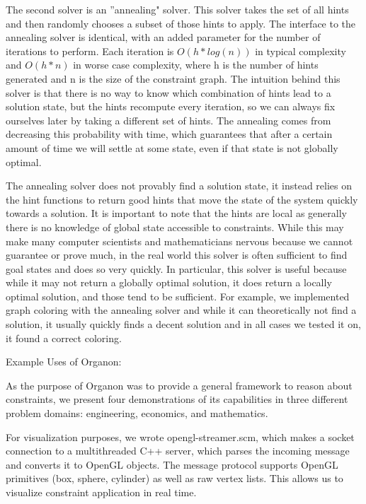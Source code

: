 \documentclass[12pt,a4paper]{article}
\begin{document}
The second solver is an ''annealing" solver. This solver takes the set of all hints and then randomly chooses a subset of those hints to apply. The interface to the annealing solver is identical, with an added parameter for the number of iterations to perform. Each iteration is $O(h * log(n))$ in typical complexity and $O(h*n)$ in worse case complexity, where h is the number of hints generated and n is the size of the constraint graph.   The intuition behind this solver is that there is no way to know which combination of hints lead to a solution state, but the hints recompute every iteration, so we can always fix ourselves later by taking a different set of hints.  The annealing comes from decreasing this probability with time, which guarantees that after a certain amount of time we will settle at some state, even if that state is not globally optimal.  

The annealing solver does not provably find a solution state, it instead relies on the hint functions to return good hints that move the state of the system quickly towards a solution.  It is important to note that the hints are local as generally there is no knowledge of global state accessible to constraints.  While this may make many computer scientists and mathematicians nervous because we cannot guarantee or prove much, in the real world this solver is often sufficient to find goal states and does so very quickly.  In particular, this solver is useful because while it may not return a globally optimal solution, it does return a locally optimal solution, and those tend to be sufficient.  For example, we implemented graph coloring with the annealing solver and while it can theoretically not find a solution, it usually quickly finds a decent solution and in all cases we tested it on, it found a correct coloring.

Example Uses of Organon:

As the purpose of Organon was to provide a general framework to reason about constraints, we present four demonstrations of its capabilities in three different problem domains: engineering, economics, and mathematics.

For visualization purposes, we wrote opengl-streamer.scm, which makes a socket connection to a multithreaded C++ server, which parses the incoming message and converts it to OpenGL objects. The message protocol supports OpenGL primitives (box, sphere, cylinder) as well as raw vertex lists. This allows us to visualize constraint application in real time. 
\end{document}
